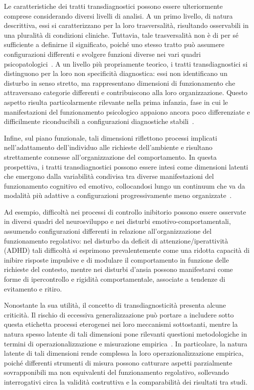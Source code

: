             Le caratteristiche dei tratti transdiagnostici possono essere ulteriormente comprese considerando diversi livelli di analisi. A un primo livello, di natura descrittiva, essi si caratterizzano per la loro trasversalità, risultando osservabili in una pluralità di condizioni cliniche. Tuttavia, tale trasversalità non è di per sé sufficiente a definirne il significato, poiché uno stesso tratto può assumere configurazioni differenti e svolgere funzioni diverse nei vari quadri psicopatologici~\cite{astle2022}. A un livello più propriamente teorico, i tratti transdiagnostici si distinguono per la loro non specificità diagnostica: essi non identificano un disturbo in senso stretto, ma rappresentano dimensioni di funzionamento che attraversano categorie differenti e contribuiscono alla loro organizzazione. Questo aspetto risulta particolarmente rilevante nella prima infanzia, fase in cui le manifestazioni del funzionamento psicologico appaiono ancora poco differenziate e difficilmente riconducibili a configurazioni diagnostiche stabili~\cite{calkins2007}.

            Infine, sul piano funzionale, tali dimensioni riflettono processi implicati nell'adattamento dell'individuo alle richieste dell'ambiente e risultano strettamente connesse all'organizzazione del comportamento. In questa prospettiva, i tratti transdiagnostici possono essere intesi come dimensioni latenti che emergono dalla variabilità condivisa tra diverse manifestazioni del funzionamento cognitivo ed emotivo, collocandosi lungo un continuum che va da modalità più adattive a configurazioni progressivamente meno organizzate~\cite{astle2022}.

            Ad esempio, difficoltà nei processi di controllo inibitorio possono essere osservate in diversi quadri del neurosviluppo e nei disturbi emotivo-comportamentali, assumendo configurazioni differenti in relazione all'organizzazione del funzionamento regolativo: nel disturbo da deficit di attenzione/iperattività (ADHD) tali difficoltà si esprimono prevalentemente come una ridotta capacità di inibire risposte impulsive e di modulare il comportamento in funzione delle richieste del contesto, mentre nei disturbi d'ansia possono manifestarsi come forme di ipercontrollo e rigidità comportamentale, associate a tendenze di evitamento e ritiro.

            Nonostante la sua utilità, il concetto di transdiagnosticità presenta alcune criticità. Il rischio di eccessiva generalizzazione può portare a includere sotto questa etichetta processi eterogenei nei loro meccanismi sottostanti, mentre la natura spesso latente di tali dimensioni pone rilevanti questioni metodologiche in termini di operazionalizzazione e misurazione empirica~\cite{nolenhoeksema2011}. In particolare, la natura latente di tali dimensioni rende complessa la loro operazionalizzazione empirica, poiché differenti strumenti di misura possono catturare aspetti parzialmente sovrapponibili ma non equivalenti del funzionamento regolativo, sollevando interrogativi circa la validità costruttiva e la comparabilità dei risultati tra studi.

